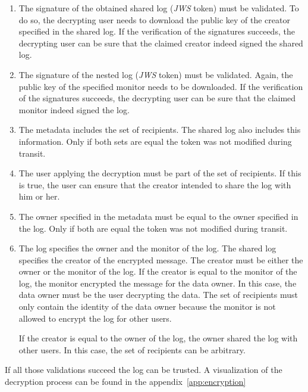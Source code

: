 \documentclass[../main.tex]{subfiles}
\begin{document}
\begin{enumerate}
    \item 
    The signature of the obtained shared log (\textit{JWS} token) must be validated.
    To do so, the decrypting user needs to download the public key of the creator specified in the shared log.
    If the verification of the signatures succeeds, the decrypting user can be sure that the claimed creator indeed signed the shared log.
    \item
    The signature of the nested log (\textit{JWS} token) must be validated.
    Again, the public key of the specified monitor needs to be downloaded.
    If the verification of the signatures succeeds, the decrypting user can be sure that the claimed monitor indeed signed the log.
    \item
    The metadata includes the set of recipients.
    The shared log also includes this information.
    Only if both sets are equal the token was not modified during transit.
    \item
    The user applying the decryption must be part of the set of recipients.
    If this is true, the user can ensure that the creator intended to share the log with him or her.
    \item
    The owner specified in the metadata must be equal to the owner specified in the log.
    Only if both are equal the token was not modified during transit.
    \item
    The log specifies the owner and the monitor of the log.
    The shared log specifies the creator of the encrypted message.
    The creator must be either the owner or the monitor of the log.
    If the creator is equal to the monitor of the log, the monitor encrypted the message for the data owner.
    In this case, the data owner must be the user decrypting the data.
    The set of recipients must only contain the identity of the data owner because the monitor is not allowed to encrypt the log for other users.

    If the creator is equal to the owner of the log, the owner shared the log with other users.
    In this case, the set of recipients can be arbitrary.
\end{enumerate}
If all those validations succeed the log can be trusted.
A visualization of the decryption process can be found in the appendix~\ref{app:encryption}
\end{document}
